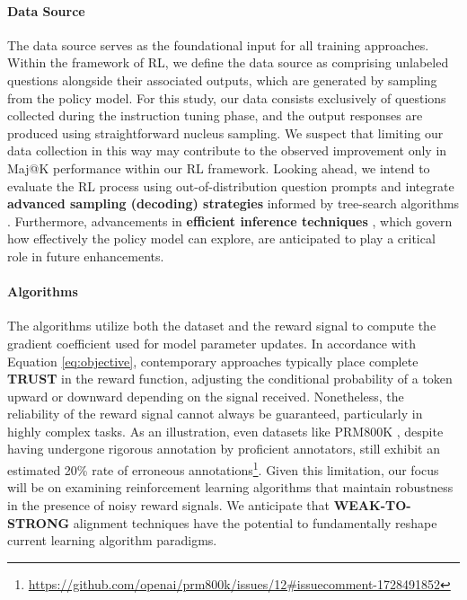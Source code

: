 \begin{itemize}[topsep=0pt]
\begin{itemize}[topsep=0pt]
\paragraph{Data Source} The data source serves as the foundational input for all training approaches. Within the framework of RL, we define the data source as comprising unlabeled questions alongside their associated outputs, which are generated by sampling from the policy model. For this study, our data consists exclusively of questions collected during the instruction tuning phase, and the output responses are produced using straightforward nucleus sampling. We suspect that limiting our data collection in this way may contribute to the observed improvement only in Maj@K performance within our RL framework. Looking ahead, we intend to evaluate the RL process using out-of-distribution question prompts and integrate \textbf{advanced sampling (decoding) strategies} informed by tree-search algorithms \citep{yao2023tree}. Furthermore, advancements in \textbf{efficient inference techniques} \citep{xia-etal-2023-speculative,leviathan2023fast,kwon2023efficient,xia2024unlocking}, which govern how effectively the policy model can explore, are anticipated to play a critical role in future enhancements.

\paragraph{Algorithms} The algorithms utilize both the dataset and the reward signal to compute the gradient coefficient used for model parameter updates. In accordance with Equation \ref{eq:objective}, contemporary approaches typically place complete \textbf{TRUST} in the reward function, adjusting the conditional probability of a token upward or downward depending on the signal received. Nonetheless, the reliability of the reward signal cannot always be guaranteed, particularly in highly complex tasks. As an illustration, even datasets like PRM800K \citep{lightman2023let}, despite having undergone rigorous annotation by proficient annotators, still exhibit an estimated 20\% rate of erroneous annotations\footnote{\url{https://github.com/openai/prm800k/issues/12\#issuecomment-1728491852}}. Given this limitation, our focus will be on examining reinforcement learning algorithms that maintain robustness in the presence of noisy reward signals. We anticipate that \textbf{WEAK-TO-STRONG} \citep{burns2023weak} alignment techniques have the potential to fundamentally reshape current learning algorithm paradigms.


\end{itemize}
\end{itemize}
